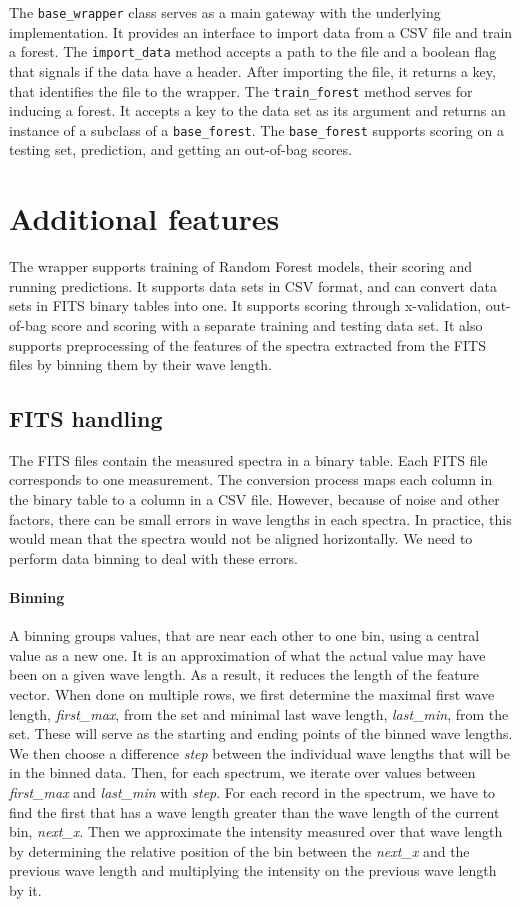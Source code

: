 \documentclass[thesis=B,english]{FITthesis}[2012/10/20]
\begin{document}
The \texttt{base\_wrapper} class serves as a main gateway with the underlying implementation. It provides an interface to import data from a CSV file and train a forest. The \texttt{import\_data} method accepts a path to the file and a boolean flag that signals if the data have a header. After importing the file, it returns a key, that identifies the file to the wrapper. The \texttt{train\_forest} method serves for inducing a forest. It accepts a key to the data set as its argument and returns an instance of a subclass of a \texttt{base\_forest}. The \texttt{base\_forest} supports scoring on a testing set, prediction, and getting an out-of-bag scores. 

\section{Additional features}
The wrapper supports training of Random Forest models, their scoring and running predictions. It supports data sets in CSV format, and can convert data sets in FITS binary tables into one. It supports scoring through x-validation, out-of-bag score and scoring with a separate training and testing data set. It also supports preprocessing of the features of the spectra extracted from the FITS files by binning them by their wave length.

\subsection{FITS handling}
The FITS files contain the measured spectra in a binary table. Each FITS file corresponds to one measurement. The conversion process maps each column in the binary table to a column in a CSV file. However, because of noise and other factors, there can be small errors in wave lengths in each spectra. In practice, this would mean that the spectra would not be aligned horizontally. We need to perform data binning to deal with these errors. 

\paragraph*{Binning}
\label{sec:binning} 
A binning groups values, that are near each other to one bin, using a central value as a new one. It is an approximation of what the actual value may have been on a given wave length. As a result, it reduces the length of the feature vector. When done on multiple rows, we first determine the maximal first wave length, \textit{first\_max}, from the set and minimal last wave length, \textit{last\_min}, from the set. These will serve as the starting and ending points of the binned wave lengths. We then choose a difference \textit{step} between the individual wave lengths that will be in the binned data. Then, for each spectrum, we iterate over values between \textit{first\_max} and \textit{last\_min} with \textit{step}. For each record in the spectrum, we have to find the first that has a wave length greater than the wave length of the current bin, \textit{next\_x}. Then we approximate the intensity measured over that wave length by determining the relative position of the bin between the \textit{next\_x} and the previous wave length and multiplying the intensity on the previous wave length by it. 
\end{document}
